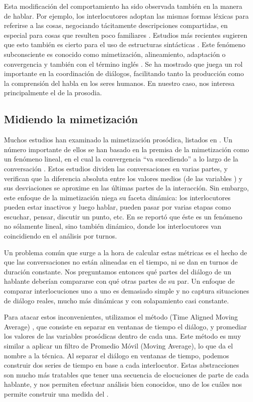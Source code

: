 Esta modificación del comportamiento ha sido observada también en la manera de hablar. Por ejemplo, los interlocutores adoptan las mismas formas léxicas para referirse a las cosas, negociando tácitamente descripciones compartidas, en especial para cosas que resulten poco familiares \cite{BRE1996}. Estudios más recientes sugieren que esto también es cierto para el uso de estructuras sintácticas \cite{REI2006}. Este fenómeno subconsciente es conocido como mimetización, alineamiento, adaptación o convergencia y también con el término inglés \entrainment. Se ha mostrado que juega un rol importante en la coordinación de diálogos, facilitando tanto la producción como la comprensión del habla en los seres humanos\cite{nenkova2008,gravano2015backward}. En nuestro caso, nos interesa principalmente el \entrainment de la prosodia.

\subsection{Midiendo la mimetización}

Muchos estudios han examinado la mimetización prosódica, listados en \cite{DEL2013}. Un número importante de ellos se han basado en la premisa de la mimetización como un fenómeno lineal, en el cual la convergencia ``va sucediendo'' a lo largo de la conversación \cite{burgoon1995interpersonal}. Estos estudios dividen las conversaciones en varias partes, y verifican que la diferencia absoluta entre los valores medios (de las variables \ap) y sus desviaciones se aproxime en las últimas partes de la interacción. Sin embargo, este enfoque de la mimetización niega su faceta dinámica: los interlocutores pueden estar inactivos y luego hablar, pueden pasar por varias etapas como escuchar, pensar, discutir un punto, etc. En \cite{levitan2011measuring} se reportó que éste es un fenómeno no sólamente lineal, sino también dinámico, donde los interlocutores van coincidiendo en el análisis por turnos.

Un problema común que surge a la hora de calcular estas métricas es el hecho de que las conversaciones no están alineadas en el tiempo, ni se dan en turnos de duración constante. Nos preguntamos entonces qué partes del diálogo de un hablante deberían compararse con qué otras partes de su par. Un enfoque de comparar interlocuciones uno a uno es demasiado simple y no captura situaciones de diálogo reales, mucho más dinámicas y con solapamiento casi constante.

Para atacar estos inconvenientes, utilizamos el método \TAMA(Time Aligned Moving Average) \cite{KOU2008}, que consiste en separar en ventanas de tiempo el diálogo, y promediar los valores de las variables prosódicas dentro de cada una. Este método es muy similar a aplicar un filtro de Promedio Móvil (Moving Average), lo que da el nombre a la técnica. Al separar el diálogo en ventanas de tiempo, podemos construir dos series de tiempo en base a cada interlocutor. Estas abstracciones son mucho más tratables que tener una secuencia de elocuciones de parte de cada hablante, y nos permiten efectuar análisis bien conocidos, uno de los cuáles nos permite construir una medida del \entrainment.

